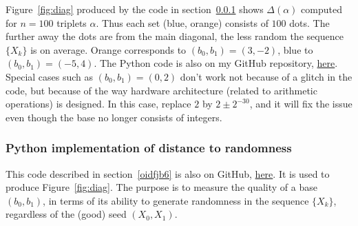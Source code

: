 \documentclass[oneside,10pt]{book}
\begin{document}
Figure~\ref{fig:diag} produced by the code in section~\ref{pulkh} shows $\Delta(\alpha)$ computed for $n=100$ triplets $\alpha$. Thus each set (blue, orange) consists of $100$ dots. The further away the dots are
 from the main diagonal, the less random the sequence $\{X_k\}$ is on average. Orange 
corresponds to $(b_0,b_1)=(3, -2)$, blue to $(b_0,b_1)=(-5,4)$. The Python code is also on my GitHub repository, 
\href{https://github.com/VincentGranville/Stochastic-Processes/blob/master/chaos_2D_base.py}{here}. Special cases such as
 $(b_0,b_1)=(0,2)$ don't work not because of a glitch in the code, but because of the way hardware architecture (related to arithmetic 
 operations) is designed. In this case, replace $2$ by $2\pm 2^{-30}$, and it will fix the issue even though the base no longer
 consists of integers. 

\subsubsection{Python implementation of distance to randomness}\label{pulkh}

This code described in section~\ref{oidfjb6} is also on GitHub, \href{https://github.com/VincentGranville/Stochastic-Processes/blob/master/chaos_2D_base.py}{here}. It is used to produce Figure~\ref{fig:diag}. 
 The purpose is to measure the quality of a base $(b_0,b_1)$, in terms of its ability to generate randomness in the sequence
 $\{X_k\}$, regardless of the (good) seed $(X_0, X_1)$. \vspace{1ex}
\end{document}
